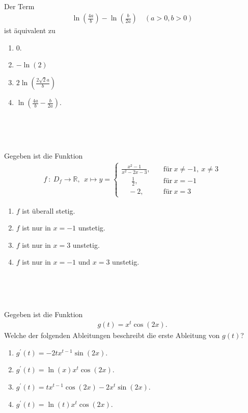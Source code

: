 \subsection*{}
Der Term
\begin{align*}
\ln \left( \frac{4a}{b} \right)
-
\ln \left( \frac{b}{2a} \right)
\quad
(a > 0 , b > 0)
\end{align*}
ist äquivalent zu
\renewcommand{\labelenumi}{(\alph{enumi})}
\begin{enumerate}
\item $0$.
\item $- \ln(2)$
\item $2  \ln \left( \frac{2 \sqrt{2}  a}{b} \right)$
\item $\ln \left( \frac{4  a}{b} - \frac{b}{2  a } \right)$.
\end{enumerate}
\ \\
\\
\subsection*{}
Gegeben ist die Funktion 
\begin{align*}
f \ : \ D_f \to \mathbb{R}, \ \
x \mapsto y=
\begin{cases}
\frac{x^2-1}{x^2 - 2x -3} , &\quad \text{für} \ x\neq -1, \ x \neq 3 \\
\quad \ \ \frac{1}{2}, &\quad \text{für} \ x = -1 \\
\quad -2, &\quad \text{für} \ x = 3
\end{cases}
\end{align*}
\renewcommand{\labelenumi}{(\alph{enumi})}
\begin{enumerate}
\item $f$ ist überall stetig.
\item $f$ ist nur in $x = -1 $ unstetig.
\item $f$ ist nur in $x = 3 $ unstetig.
\item $f$ ist nur in $x = -1 $ und $x = 3 $ unstetig.
\end{enumerate}
\ \\
\\
\subsection*{}
Gegeben ist die Funktion
\begin{align*}
g(t) = x^t  \cos(2x).
\end{align*}
Welche der folgenden Ableitungen beschreibt die erste Ableitung von $g(t)$?
\renewcommand{\labelenumi}{(\alph{enumi})}
\begin{enumerate}
\item $g^\prime(t) = -2  t  x^{t-1}  \sin(2x)$.
\item $g^\prime(t) = \ln(x)   x^t  \cos(2x) $.
\item $g^\prime(t) = t  x^{t-1}  \cos(2x) - 2 x^t  \sin(2x)$.
\item $g^\prime(t) = \ln(t)  x^t  \cos(2x)$.
\end{enumerate}
\ \\
\\
